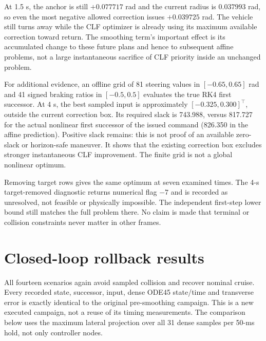 \documentclass[10pt]{article}
\begin{document}
At 1.5 s, the anchor is still $+0.077717$ rad and the current radius is
$0.037993$ rad, so even the most negative allowed correction issues
$+0.039725$ rad. The vehicle still turns away while the CLF optimizer is already
using its maximum available correction toward return. The smoothing term's
important effect is its accumulated change to these future plans and hence
to subsequent affine problems, not a large instantaneous sacrifice of CLF
priority inside an unchanged problem.

For additional evidence, an offline grid of 81 steering values in
$[-0.65,0.65]$ rad and 41 signed braking ratios in $[-0.5,0.5]$ evaluates the
true RK4 first successor. At 4 s, the best sampled input is approximately
$[-0.325,0.300]^\top$, outside the current correction box. Its required slack
is 743.988, versus 817.727 for the actual nonlinear first successor of the
issued command (826.350 in the affine prediction). Positive slack remains:
this is not proof of an available zero-slack or horizon-safe maneuver. It
shows that the existing correction box excludes stronger instantaneous
CLF improvement. The finite grid is not a global nonlinear optimum.

Removing target rows gives the same optimum at seven examined times. The
4-s target-removed diagnostic returns numerical flag $-7$ and is recorded
as unresolved, not feasible or physically impossible. The independent
first-step lower bound still matches the full problem there. No claim is
made that terminal or collision constraints never matter in other frames.

\section{Closed-loop rollback results}
All fourteen scenarios again avoid sampled collision and recover nominal
cruise. Every recorded state, successor, input, dense ODE45 state/time and
transverse error is exactly identical to the original pre-smoothing campaign.
This is a new executed campaign, not a reuse of its timing measurements.
The comparison below uses the maximum lateral projection over all 31 dense
samples per 50-ms hold, not only controller nodes.
\end{document}
